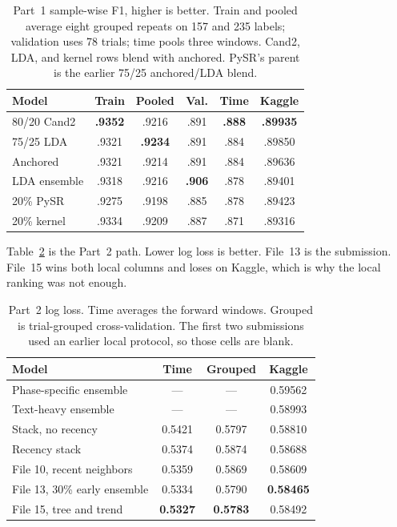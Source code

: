 \documentclass[10pt,twocolumn,letterpaper]{article}
\begin{document}
\begin{table}[t]
\centering\small
\setlength{\tabcolsep}{2pt}
\begin{tabular*}{\columnwidth}{@{\extracolsep{\fill}}lccccc@{}}
\toprule
Model & Train & Pooled & Val. & Time & Kaggle \\
\midrule
80/20 Cand2 & \textbf{.9352} & .9216 & .891 & \textbf{.888} & \textbf{.89935} \\
75/25 LDA & .9321 & \textbf{.9234} & .891 & .884 & .89850 \\
Anchored & .9321 & .9214 & .891 & .884 & .89636 \\
LDA ensemble & .9318 & .9216 & \textbf{.906} & .878 & .89401 \\
20\% PySR & .9275 & .9198 & .885 & .878 & .89423 \\
20\% kernel & .9334 & .9209 & .887 & .871 & .89316 \\
\bottomrule
\end{tabular*}
\caption{Part~1 sample-wise F1, higher is better. Train and pooled average
eight grouped repeats on 157 and 235 labels; validation uses 78 trials; time
pools three windows. Cand2, LDA, and kernel rows blend with anchored. PySR's
parent is the earlier 75/25 anchored/LDA blend.}
\label{tab:p1}
\end{table}

Table~\ref{tab:p2} is the Part~2 path. Lower log loss is better. File~13 is the
submission. File~15 wins both local columns and loses on Kaggle, which is why
the local ranking was not enough.

\begin{table}[t]
\centering\small
\setlength{\tabcolsep}{3pt}
\begin{tabular*}{\columnwidth}{@{\extracolsep{\fill}}lccc@{}}
\toprule
Model & Time & Grouped & Kaggle \\
\midrule
Phase-specific ensemble & --- & --- & 0.59562 \\
Text-heavy ensemble & --- & --- & 0.58993 \\
Stack, no recency & 0.5421 & 0.5797 & 0.58810 \\
Recency stack & 0.5374 & 0.5874 & 0.58688 \\
File 10, recent neighbors & 0.5359 & 0.5869 & 0.58609 \\
File 13, 30\% early ensemble & 0.5334 & 0.5790 & \textbf{0.58465} \\
File 15, tree and trend & \textbf{0.5327} & \textbf{0.5783} & 0.58492 \\
\bottomrule
\end{tabular*}
\caption{Part~2 log loss. Time averages the forward windows. Grouped is
trial-grouped cross-validation. The first two submissions used an earlier
local protocol, so those cells are blank.}
\label{tab:p2}
\end{table}
\end{document}
